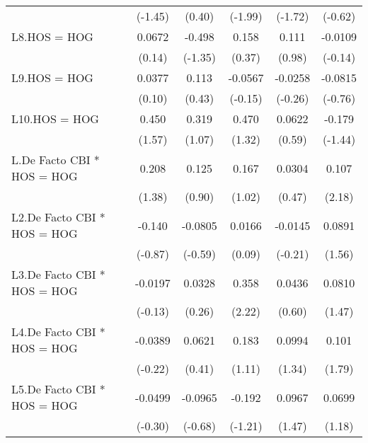 {\begin{longtable}{l*{5}{c}}
                &  (-1.45)         &   (0.40)         &  (-1.99)         &  (-1.72)         &  (-0.62)         \\
[1em]
L8.HOS = HOG    &   0.0672         &   -0.498         &    0.158         &    0.111         &  -0.0109         \\
                &   (0.14)         &  (-1.35)         &   (0.37)         &   (0.98)         &  (-0.14)         \\
[1em]
L9.HOS = HOG    &   0.0377         &    0.113         &  -0.0567         &  -0.0258         &  -0.0815         \\
                &   (0.10)         &   (0.43)         &  (-0.15)         &  (-0.26)         &  (-0.76)         \\
[1em]
L10.HOS = HOG   &    0.450         &    0.319         &    0.470         &   0.0622         &   -0.179         \\
                &   (1.57)         &   (1.07)         &   (1.32)         &   (0.59)         &  (-1.44)         \\
[1em]
L.De Facto CBI * HOS = HOG&    0.208         &    0.125         &    0.167         &   0.0304         &    0.107\sym{*}  \\
                &   (1.38)         &   (0.90)         &   (1.02)         &   (0.47)         &   (2.18)         \\
[1em]
L2.De Facto CBI * HOS = HOG&   -0.140         &  -0.0805         &   0.0166         &  -0.0145         &   0.0891         \\
                &  (-0.87)         &  (-0.59)         &   (0.09)         &  (-0.21)         &   (1.56)         \\
[1em]
L3.De Facto CBI * HOS = HOG&  -0.0197         &   0.0328         &    0.358\sym{*}  &   0.0436         &   0.0810         \\
                &  (-0.13)         &   (0.26)         &   (2.22)         &   (0.60)         &   (1.47)         \\
[1em]
L4.De Facto CBI * HOS = HOG&  -0.0389         &   0.0621         &    0.183         &   0.0994         &    0.101         \\
                &  (-0.22)         &   (0.41)         &   (1.11)         &   (1.34)         &   (1.79)         \\
[1em]
L5.De Facto CBI * HOS = HOG&  -0.0499         &  -0.0965         &   -0.192         &   0.0967         &   0.0699         \\
                &  (-0.30)         &  (-0.68)         &  (-1.21)         &   (1.47)         &   (1.18)         \\

\end{longtable}}

